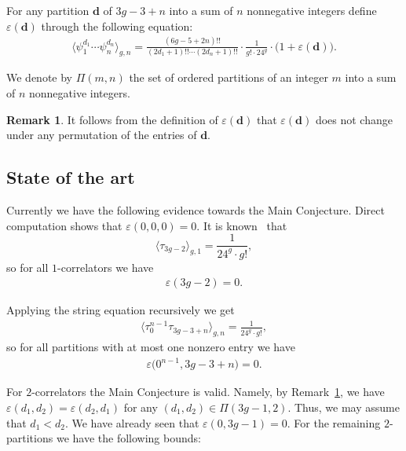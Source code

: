 \documentclass[11pt]{article}
\renewcommand{\epsilon}{\varepsilon}
\theoremstyle{definition}
\newtheorem{Remark}[Theorem]{Remark}
\begin{document}
For any partition $\boldsymbol{d}$ of $3g-3+n$
into a sum of $n$ nonnegative integers define
$\epsilon(\boldsymbol{d})$ through the following equation:
\begin{gather*}%
\big\langle \psi_1^{d_1} \cdots \psi_n^{d_n}\big\rangle_{g,n}
=
\frac{(6g-5+2n)!!}{(2d_1+1)!!\cdots(2d_n+1)!!}
\cdot\frac{1}{g!\cdot 24^g} \cdot\big(1+\epsilon(\boldsymbol{d})\big) .
\end{gather*}

We denote by $\Pi(m,n)$ the
set of ordered partitions of an integer $m$ into a sum of $n$ nonnegative integers.

\setcounter{section}{1}
\setcounter{subsection}{0}
\setcounter{subsubsection}{0}
\setcounter{Theorem}{0}
\setcounter{equation}{2}
\begin{Remark}\label{rm:permutation:of:d}
It follows from the definition of $\epsilon(\boldsymbol{d})$ that $\epsilon(\boldsymbol{d})$ does not change under any permutation of the entries of $\boldsymbol{d}$.
\end{Remark}

\setcounter{section}{1}
\setcounter{subsection}{0}
\setcounter{subsubsection}{0}
\setcounter{Theorem}{4}
\setcounter{equation}{2}
\subsection{State of the art}\label{ss:state:of:the:art}

Currently we have the following evidence towards the Main Conjecture. Direct computation shows that $\epsilon(0,0,0)=0$. It is known~\cite{Witten} that
\[
\langle\tau_{3g-2}\rangle_{g,1}=\frac{1}{24^g\cdot g!} ,
\]
so for all $1$-correlators we have
\begin{gather}\label{eq:epsilon:for:1:correlators}
\epsilon(3g-2)=0 .
\end{gather}

Applying the string equation recursively we get
\begin{gather}
\label{eq:almost:zero:partition}
\big\langle\tau_0^{n-1}\tau_{3g-3+n}\big\rangle_{g,n}=\frac{1}{24^g\cdot g!} ,
\end{gather}
so for all partitions with at most one nonzero entry we have
\begin{gather}\label{eq:epsilon:0:1corr}
\epsilon\big(0^{n-1},3g-3+n\big)=0 .
\end{gather}

For $2$-correlators the Main Conjecture is valid. Namely, by Remark~\ref{rm:permutation:of:d}, we have $\epsilon(d_1,d_2)= \epsilon(d_2,d_1)$ for any $(d_1,d_2)\in\Pi(3g-1,2)$. Thus, we may assume that $d_1<d_2$. We have already seen that $\epsilon(0,3g-1)=0$. For the remaining $2$-partitions we have the following bounds:
\end{document}
